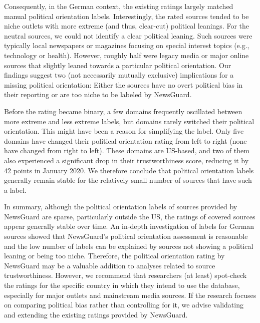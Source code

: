 \documentclass[12pt,twoside]{article}
\begin{document}
Consequently, in the German context, the existing ratings largely matched manual political orientation labels.
Interestingly, the rated sources tended to be niche outlets with more extreme (and thus, clear-cut) political leanings.
For the neutral sources, we could not identify a clear political leaning. 
Such sources were typically local newspapers or magazines focusing on special interest topics (e.g., technology or health). 
However, roughly half were legacy media or major online sources that slightly leaned towards a particular political orientation.
Our findings suggest two (not necessarily mutually exclusive) implications for a missing political orientation: Either the sources have no overt political bias in their reporting or are too niche to be labeled by NewsGuard.


Before the rating became binary, a few domains frequently oscillated between more extreme and less extreme labels, but domains rarely switched their political orientation. 
This might have been a reason for simplifying the label.
Only five domains have changed their political orientation rating from left to right (none have changed from right to left).
These domains are US-based, and two of them also experienced a significant drop in their trustworthiness score, reducing it by 42 points in January 2020.
We therefore conclude that political orientation labels generally remain stable for the relatively small number of sources that have such a label.

In summary, although the political orientation labels of sources provided by NewsGuard are sparse, particularly outside the US, the ratings of covered sources appear generally stable over time. 
An in-depth investigation of labels for German sources showed that NewsGuard's political orientation assessment is reasonable and the low number of labels can be explained by sources not showing a political leaning or being too niche.
Therefore, the political orientation rating by NewsGuard may be a valuable addition to analyses related to source trustworthiness.  
However, we recommend that researchers (at least) spot-check the ratings for the specific country in which they intend to use the database, especially for major outlets and mainstream media sources. 
If the research focuses on comparing political bias rather than controlling for it, we advise validating and extending the existing ratings provided by NewsGuard.
\end{document}
